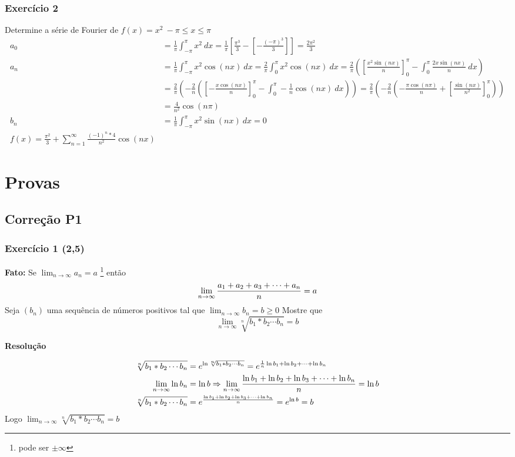 \documentclass[12pt,openany, letterpaper]{book}
\newcommand{\LI}[1][n]{\lim_{{#1} \rightarrow \infty}}
\newcommand{\soma}[2][n]{\sum_{{#1} = #2}^\infty}
\newcommand{\E}[1]{Exercício #1}
\newcommand{\Resolve}{\begin{center} \textbf{Resolução} \end{center}}
\newcommand{\IP}{\int_{-\pi}^{\pi}}
\begin{document}
{{\section*{\E 2} Determine a série de Fourier de $f(x) = x^2\ -\pi \leq x \leq \pi$ \begin{align*}
    a_0 &= \frac{1}{\pi} \IP x^2 \ dx = \frac{1}{\pi} \left[\frac{\pi^3}{3}-\left[-\frac{(-\pi)^3}{3}\right]\right] = \frac{2\pi^2}{3}\\
    a_n &= \frac{1}{\pi} \IP x^2 \cos (nx) \ dx = \frac{2}{\pi} \int_0^\pi x^2 \cos (nx) \ dx = \frac{2}{\pi}\left( \left[ \frac{x^2 \sin (nx)}{n}\right]_0^\pi- \int_0^\pi \frac{2x \sin (nx)}{n} \ dx\right) \\
    &= \frac{2}{\pi}\left(-\frac{2}{n}\left(\left[-\frac{x \cos (nx)}{n}\right]_0^\pi - \int_0^\pi -\frac{1}{n}\cos (nx)\ dx \right)\right) = \frac{2}{\pi}\left(-\frac{2}{n}\left(-\frac{\pi \cos (n\pi)}{n} + \left[\frac{\sin (nx)}{n^2}\right]_0^\pi\right)\right) \\
    &= \frac{4}{n^2}\cos (n\pi)\\
    b_n &= \frac{1}{\pi} \IP x^2 \sin (nx) \ dx = 0 \\
    f(x) = \frac{\pi^2}{3}+\soma{1} \frac{(-1)^n * 4}{n^2} \cos (nx)
\end{align*}

\section*{}

\part{Provas}
\chapter{Correção P1}
\label{C:P1}

\section*{\E{1} (2,5)}{\textbf{Fato:} Se $\displaystyle{\LI a_n = a}$ \footnote{pode ser $\pm \infty$} então $$\LI {a_1 + a_2 + a_3 + \cdots + a_n \over n} = a$$ Seja $(b_n)$ uma sequência de números positivos tal que $\displaystyle{\LI b_n = b \geq 0}$ Mostre que $$\LI \sqrt[n]{b_1*b_2\cdots b_n} = b $$}

\Resolve

\begin{align*}
\sqrt[n]{b_1*b_2\cdots b_n} &= e^{\ln{\sqrt[n]{b_1*b_2\cdots b_n}}} = e^{{1 \over n} \ln{b_1} + \ln{b_2} + \cdots + \ln{b_n}}\\
\LI \ln{b_n} &= \ln{b} \Rightarrow \LI {\ln{b_1} + \ln{b_2} + \ln{b_3} + \cdots + \ln{b_n} \over n} = \ln{b} \\
\sqrt[n]{b_1*b_2\cdots b_n} &= e^{\ln{b_1} + \ln{b_2} + \ln{b_3} + \cdots + \ln{b_n} \over n} = e^{\ln{b}} = b \\
\end{align*}
Logo $\displaystyle{\LI \sqrt[n]{b_1*b_2\cdots b_n} = b}$

}}
\end{document}
